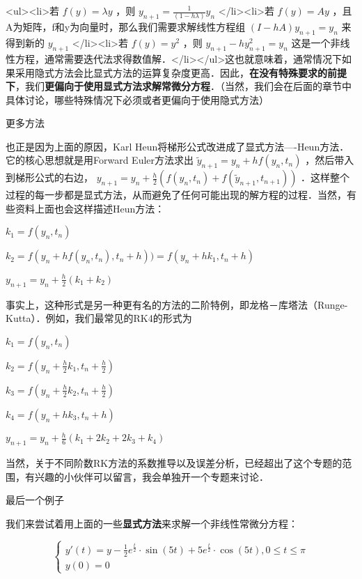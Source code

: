 <ul><li>若  $f(y)=\lambda y$  ，则  $y_{n+1}=\frac{1}{(1-h\lambda)}y_n$  </li><li>若  $f(y)=A y$  ，且A为矩阵，f和y为向量时，那么我们需要求解线性方程组  $(I-hA)y_{n+1}=y_n$  来得到新的  $y_{n+1}$  </li><li>若  $f(y)=y^2$  ，则  $y_{n+1}-hy^2_{n+1} = y_n$ 这是一个非线性方程，通常需要迭代法求得数值解．</li></ul>这也就意味着，通常情况下如果采用隐式方法会比显式方法的运算复杂度更高．因此，\textbf{在没有特殊要求的前提下}，我们\textbf{更偏向于使用显式方法求解常微分方程}．（当然，我们会在后面的章节中具体讨论，哪些特殊情况下必须或者更偏向于使用隐式方法）



更多方法

也正是因为上面的原因，Karl Heun将梯形公式改进成了显式方法----Heun方法．它的核心思想就是用Forward Euler方法求出  $\tilde{y}_{n+1}=y_n+hf(y_n,t_n)$ ，然后带入到梯形公式的右边，  $y_{n+1}=y_n+\frac{h}{2}\left(f(y_n,t_n)+f(\tilde{y}_{n+1},t_{n+1}) \right)$ ．这样整个过程的每一步都是显式方法，从而避免了任何可能出现的解方程的过程．当然，有些资料上面也会这样描述Heun方法：

 $k_1=f(y_n,t_n)$  

 $k_2=f(y_n+hf(y_n,t_n),t_n+h))=f(y_n+hk_1,t_n+h)$  

 $y_{n+1}=y_n+\frac{h}{2}(k_1+k_2)$  

事实上，这种形式是另一种更有名的方法的二阶特例，即龙格－库塔法（Runge-Kutta）．例如，我们最常见的RK4的形式为

 $k_1=f(y_n,t_n)$  

 $k_2=f\left(y_n+\frac{h}{2}k_1, t_n+\frac{h}{2}\right)$  

 $k_3=f\left(y_n+\frac{h}{2}k_2, t_n+\frac{h}{2}\right)$  

 $k_4=f\left(y_n+hk_3, t_n+h\right)$  

 $y_{n+1}=y_{n}+\frac{h}{6}(k_1+2k_2+2k_3+k_4)$  

当然，关于不同阶数RK方法的系数推导以及误差分析，已经超出了这个专题的范围，有兴趣的小伙伴可以留言，我会单独开一个专题来讨论．



最后一个例子

我们来尝试着用上面的一些\textbf{显式方法}来求解一个非线性常微分方程：

\begin{equation}
\begin{cases}
 y'(t) = y-\frac{1}{2}e^{\frac{t}{2}}\cdot\sin(5t)+5e^{\frac{t}{2}}\cdot\cos(5t), 0\le t\le \pi\\     y(0)=0
\end{cases}
\end{equation}

